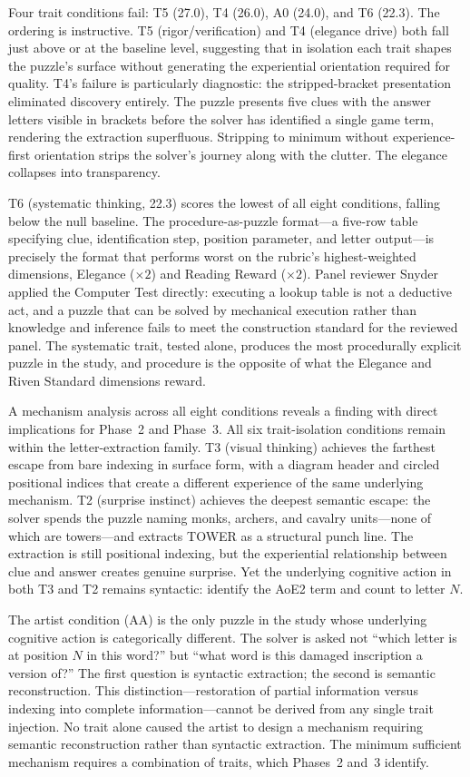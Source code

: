 Four trait conditions fail: T5 (27.0), T4 (26.0), A0 (24.0), and T6 (22.3). The ordering is instructive. T5 (rigor/verification) and T4 (elegance drive) both fall just above or at the baseline level, suggesting that in isolation each trait shapes the puzzle's surface without generating the experiential orientation required for quality. T4's failure is particularly diagnostic: the stripped-bracket presentation eliminated discovery entirely. The puzzle presents five clues with the answer letters visible in brackets before the solver has identified a single game term, rendering the extraction superfluous. Stripping to minimum without experience-first orientation strips the solver's journey along with the clutter. The elegance collapses into transparency.

T6 (systematic thinking, 22.3) scores the lowest of all eight conditions, falling below the null baseline. The procedure-as-puzzle format---a five-row table specifying clue, identification step, position parameter, and letter output---is precisely the format that performs worst on the rubric's highest-weighted dimensions, Elegance ($\times 2$) and Reading Reward ($\times 2$). Panel reviewer Snyder applied the Computer Test directly: executing a lookup table is not a deductive act, and a puzzle that can be solved by mechanical execution rather than knowledge and inference fails to meet the construction standard for the reviewed panel. The systematic trait, tested alone, produces the most procedurally explicit puzzle in the study, and procedure is the opposite of what the Elegance and Riven Standard dimensions reward.

A mechanism analysis across all eight conditions reveals a finding with direct implications for Phase~2 and Phase~3. All six trait-isolation conditions remain within the letter-extraction family. T3 (visual thinking) achieves the farthest escape from bare indexing in surface form, with a diagram header and circled positional indices that create a different experience of the same underlying mechanism. T2 (surprise instinct) achieves the deepest semantic escape: the solver spends the puzzle naming monks, archers, and cavalry units---none of which are towers---and extracts TOWER as a structural punch line. The extraction is still positional indexing, but the experiential relationship between clue and answer creates genuine surprise. Yet the underlying cognitive action in both T3 and T2 remains syntactic: identify the AoE2 term and count to letter $N$.

The artist condition (AA) is the only puzzle in the study whose underlying cognitive action is categorically different. The solver is asked not ``which letter is at position $N$ in this word?'' but ``what word is this damaged inscription a version of?'' The first question is syntactic extraction; the second is semantic reconstruction. This distinction---restoration of partial information versus indexing into complete information---cannot be derived from any single trait injection. No trait alone caused the artist to design a mechanism requiring semantic reconstruction rather than syntactic extraction. The minimum sufficient mechanism requires a combination of traits, which Phases~2 and~3 identify.

